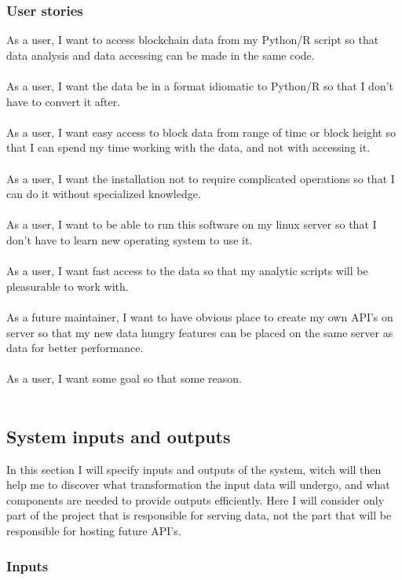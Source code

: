 \documentclass[12pt, en, eng]{mgr}
\begin{document}
\subsubsection{User stories}
As a user, I want to access blockchain data from my Python/R script so that data analysis and data accessing can be made in the same code.
\\
\\
As a user, I want the data be in a format idiomatic to Python/R so that I don't have to convert it after.
\\
\\
As a user, I want easy access to block data from range of time or block height so that I can spend my time working with the data, and not with accessing it.
\\
\\
As a user, I want the installation not to require complicated operations so that I can do it without specialized knowledge.
\\
\\
As a user, I want to be able to run this software on my linux server so that I don't have to learn new operating system to use it.
\\
\\
As a user, I want fast access to the data so that my analytic scripts will be pleasurable to work with.
\\
\\
As a future maintainer, I want to have obvious place to create my own API's on server so that my new data hungry features can be placed on the same server as data for better performance.
\\
\\
As a user, I want some goal so that some reason.
\\
\\

\subsection{System inputs and outputs}

In this section I will specify inputs and outputs of the system, witch will then help me to discover what transformation the input data will undergo, and what components are needed to provide outputs efficiently. Here I will consider only part of the project that is responsible for serving data, not the part that will be responsible for hosting future API's.

\subsubsection{Inputs}
\end{document}
